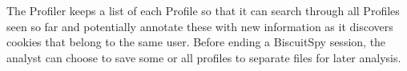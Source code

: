 The Profiler keeps a list of each Profile so that it can search through all Profiles seen so far and potentially annotate these with new information as it discovers cookies that belong to the same user. 
Before ending a BiscuitSpy session, the analyst can choose to save some or all profiles to separate files for later analysis.